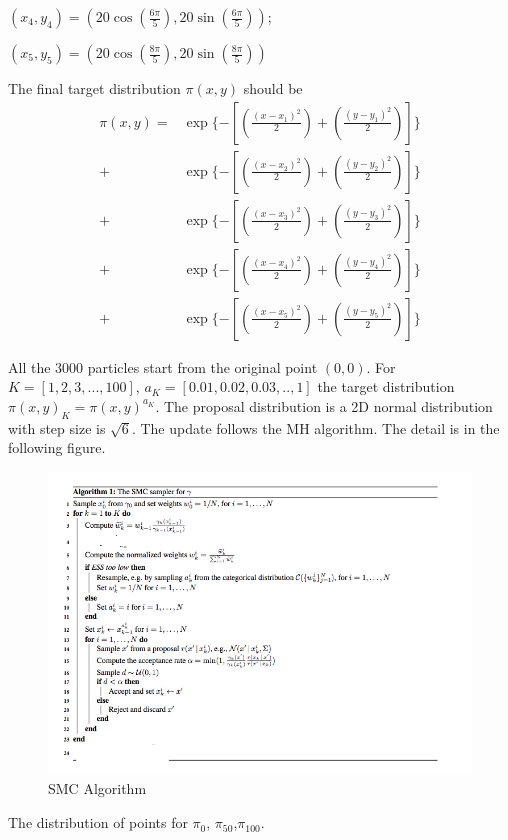 \documentclass{article}
\begin{document}
$(x_4,y_4) = (20\cos(\frac{6\pi}{5}),20 \sin(\frac{6\pi}{5}))$; 

$(x_5,y_5) = (20\cos(\frac{8\pi}{5}),20 \sin(\frac{8\pi}{5}))$

The final target distribution $\pi(x,y)$ should  be
\begin{equation}
\begin{aligned}
    \pi(x,y) =   & \exp\{ -[(\frac{(x-x_1)^2}{2})+(\frac{(y-y_1)^2}{2})] \} \\
     + & \exp\{-[(\frac{(x-x_2)^2}{2})+(\frac{(y-y_2)^2}{2})] \} \\
     + & \exp\{-[(\frac{(x-x_3)^2}{2})+(\frac{(y-y_3)^2}{2})] \} \\
     + & \exp\{-[(\frac{(x-x_4)^2}{2})+(\frac{(y-y_4)^2}{2})] \}   \\
     + & \exp\{-[(\frac{(x-x_5)^2}{2})+(\frac{(y-y_5)^2}{2})] \}
\end{aligned}
\end{equation}

All the 3000 particles start from the original point $(0,0)$.
For $K = [1,2,3,...,100]$, $a_{K} = [0.01,0.02,0.03,..,1]$ the target distribution $\pi(x,y)_{K} = \pi(x,y)^{a_K}$. The proposal distribution is a 2D normal distribution with step size is $\sqrt{6}$. The update follows the MH algorithm. The detail is in the following figure.

\begin{figure}[h!]
\centering
\includegraphics[scale=0.46]{SMCalgorithm.png}
\caption{SMC Algorithm}
\end{figure}

The distribution of points for $\pi_{0}$, $\pi_{50}$,$\pi_{100}$.
\end{document}

